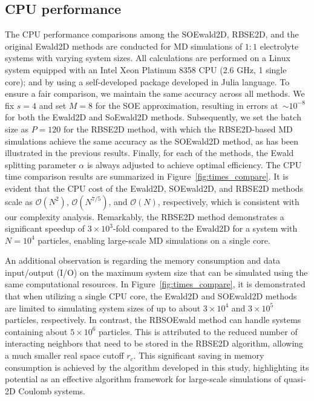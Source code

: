 \subsection{CPU performance}
The CPU performance comparisons among the SOEwald2D, RBSE2D, and the original Ewald2D methods are conducted for MD simulations of $1:1$ electrolyte systems with varying system sizes. 
All calculations are performed on a Linux system equipped with an Intel Xeon Platinum 8358 CPU (2.6 GHz, 1 single core); and by using a self-developed package developed in Julia language. 
To ensure a fair comparison, we maintain the same accuracy across all methods. We fix $s=4$ and set $M=8$ for the SOE approximation, resulting in errors at~$\sim10^{-8}$ for both the Ewald2D and SoEwald2D methods. %
Subsequently, we set the batch size as $P=120$ for the RBSE2D method, with which the RBSE2D-based MD simulations achieve the same accuracy as the SOEwald2D method, as has been illustrated in the previous results.
Finally, for each of the methods, the Ewald splitting parameter $\alpha$ is always adjusted to achieve optimal efficiency.
The CPU time comparison results are summarized in Figure~\ref{fig:times_compare}. 
It is evident that the CPU cost of the Ewald2D, SOEwald2D, and RBSE2D methods scale as $\mathcal{O}(N^2)$, $\mathcal{O}(N^{7/5})$, and $\mathcal{O}(N)$, respectively, which is consistent with our complexity analysis. 
Remarkably, the RBSE2D method demonstrates a significant speedup of $3\times 10^3$-fold compared to the Ewald2D for a system with $N=10^{4}$ particles, enabling large-scale MD simulations on a single core.

An additional observation is regarding the memory consumption and data input/output (I/O) on the maximum system size that can be simulated using the same computational resources. 
In Figure~\ref{fig:times_compare}, it is demonstrated that when utilizing a single CPU core, the Ewald2D and SOEwald2D methods are limited to simulating system sizes of up to about $3 \times 10^4$ and $3 \times 10^5$ particles, respectively. 
In contrast, the RBSOEwald method can handle systems containing about $5 \times 10^6$ particles. 
This is attributed to the reduced number of interacting neighbors that need to be stored in the RBSE2D algorithm, allowing a much smaller real space cutoff $r_c$. 
This significant saving in memory consumption is achieved by the algorithm developed in this study, highlighting its potential as an effective algorithm framework for large-scale simulations of quasi-2D Coulomb systems.

